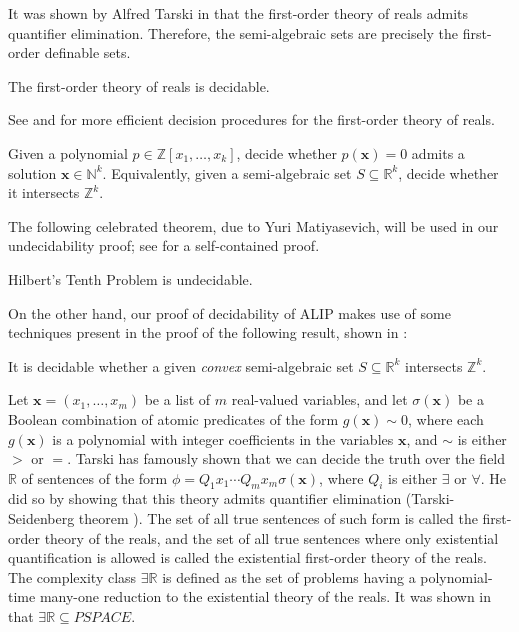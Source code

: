 It was shown by Alfred Tarski in \cite{Tarski} that the first-order theory of reals admits quantifier elimination. Therefore, the semi-algebraic sets are precisely the first-order definable sets.

\begin{theorem}[Tarski]
The first-order theory of reals is decidable.
\end{theorem}

See \cite{Renegar} and \cite{BPR06} for more efficient decision procedures for the first-order theory of reals.

\begin{definition}
Given a polynomial $p \in \mathbb{Z}[x_{1}, \ldots, x_{k}]$, decide whether $p(\boldsymbol{x}) = 0$ admits a solution $\boldsymbol{x} \in \mathbb{N}^{k}$. Equivalently, given a semi-algebraic set $S \subseteq \mathbb{R}^{k}$, decide whether it intersects $\mathbb{Z}^{k}$.
\end{definition}

The following celebrated theorem, due to Yuri Matiyasevich, will be used in
our undecidability proof; see \cite{HTP} for a self-contained proof.

\begin{theorem}[Matiyasevich]
Hilbert's Tenth Problem is undecidable.
\end{theorem}

On the other hand, our proof of decidability of ALIP makes use of some techniques present in the proof of the following result, shown in \cite{KP}:

\begin{theorem}
It is decidable whether a given \emph{convex} semi-algebraic set $S \subseteq \mathbb{R}^{k}$ intersects $\mathbb{Z}^{k}$.
\end{theorem}

Let $\boldsymbol{x}=(x_1,\ldots,x_m)$ be a list of $m$ real-valued
variables, and let $\sigma(\boldsymbol{x})$ be a Boolean combination
of atomic predicates of the form $g(\boldsymbol{x})\sim 0$, where each
$g(\boldsymbol{x})$ is a polynomial with integer coefficients in the
variables $\boldsymbol{x}$, and $\sim$ is either $>$ or $=$. Tarski
has famously shown that we can decide the truth over the field
$\mathbb{R}$ of sentences of the form
$\phi=Q_1 x_1 \cdots Q_m x_m \sigma(\boldsymbol{x})$, where $Q_i$ is
either $\exists$ or $\forall$. He did so by showing that this theory
admits quantifier elimination (Tarski-Seidenberg theorem
\cite{Tar51}). The set of all true sentences of such form is called
the first-order theory of the reals, and the set of all true sentences
where only existential quantification is allowed is called the
existential first-order theory of the reals. The complexity class
$\exists\mathbb{R}$ is defined as the set of problems having a
polynomial-time many-one reduction to the existential theory of
the reals. It was shown in \cite{Canny88} that
$\exists\mathbb{R}\subseteq \mathit{PSPACE}$.

